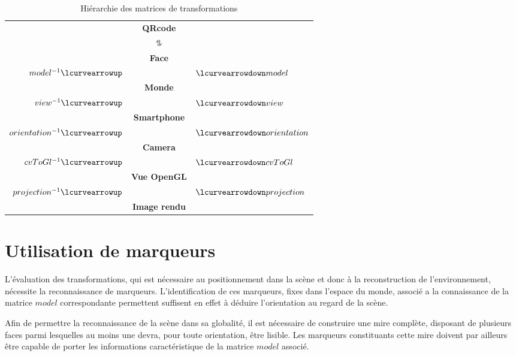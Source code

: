 \documentclass[10pt,a4paper,twoside, twocolumn]{report}
\begin{document}
\begin{table}[!ht]
	\centering
	\begin{tabular}{rcl}
																			& \textbf{QRcode}				&																\\[.2cm]
		$ $																& $\updownharpoons$			& $ $														\\[.2cm]
																			& \textbf{Face}					&																\\[.2cm]
		$model^{-1}				\lcurvearrowup$	&												& $\lcurvearrowdown model$			\\[.2cm]
																			& \textbf{Monde}				&																\\[.2cm]
		$view^{-1}				\lcurvearrowup$	& 											& $\lcurvearrowdown view$				\\[.2cm]
																			& \textbf{Smartphone}		&																\\[.2cm]
		$orientation^{-1}	\lcurvearrowup$	& 											& $\lcurvearrowdown orientation$\\[.2cm]
																			& \textbf{Camera}				&																\\[.2cm]
		$cvToGl^{-1}			\lcurvearrowup$	& 											& $\lcurvearrowdown cvToGl $		\\[.2cm]
																			& \textbf{Vue OpenGL}		&																\\[.2cm]
		$projection^{-1}	\lcurvearrowup$	&												& $\lcurvearrowdown projection$	\\[.2cm]
																			& \textbf{Image rendu}	&
	\end{tabular}
	\caption{Hiérarchie des matrices de transformations}
	\label{ref:table:hierarchie}
\end{table}



\section{Utilisation de marqueurs}

L'évaluation des transformations, qui est nécessaire au positionnement dans la scène et donc à la reconstruction de l'environnement, nécessite la reconnaissance de marqueurs. L'identification de ces marqueurs, fixes dans l'espace du monde, associé a la connaissance de la matrice $model$ correspondante permettent suffisent en effet à déduire l'orientation au regard de la scène.

Afin de permettre la reconnaissance de la scène dans sa globalité, il est nécessaire de construire une mire complète, disposant de plusieurs faces parmi lesquelles au moins une devra, pour toute orientation, être lisible. Les marqueurs constituants cette mire doivent par ailleurs être capable de porter les informations caractéristique de la matrice $model$ associé.
\end{document}
